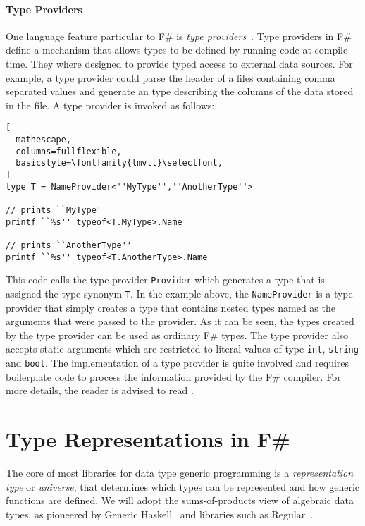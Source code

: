 \documentclass{sigplanconf}
\begin{document}
\paragraph{Type Providers}
One language feature particular to F\# is \emph{type
  providers}~\cite{typeProviders}. Type providers in F\# define a
mechanism that allows types to be defined by running code at compile
time. They where designed to provide typed access to external data
sources. For example, a type provider could parse the header of a
files containing comma separated values and generate an type
describing the columns of the data stored in the file. A type provider
is invoked as follows:
\begin{lstlisting}[
  mathescape,
  columns=fullflexible,
  basicstyle=\fontfamily{lmvtt}\selectfont,
]
type T = NameProvider<''MyType'',''AnotherType''>

// prints ``MyType''
printf ``%s'' typeof<T.MyType>.Name

// prints ``AnotherType''
printf ``%s'' typeof<T.AnotherType>.Name

\end{lstlisting}
This code calls the type provider \verb+Provider+ which generates a
type that is assigned the type synonym \verb+T+. In the example above,
the \verb+NameProvider+ is a type provider that simply creates a type
that contains nested types named as the arguments that were passed
to the provider. As it can be seen, the types created by the type
provider can be used as ordinary F\# types. The type provider also
accepts static arguments which are restricted to literal values of
type \verb+int+, \verb+string+ and \verb+bool+. The implementation of
a type provider is quite involved and requires boilerplate code
to process the information provided by the F\# compiler. For more
details, the reader is advised to read \cite{TypeProviderTutorial}.

\section{Type Representations in F\#}
\label{sec:representation}

The core of most libraries for data type generic programming is a
\emph{representation type} or \emph{universe}, that determines which
types can be represented and how generic functions are defined. We
will adopt the sums-of-products view of algebraic data types, as
pioneered by Generic Haskell~\cite{GenericHaskell} and libraries such
as Regular~\cite{Regular}.
\end{document}
